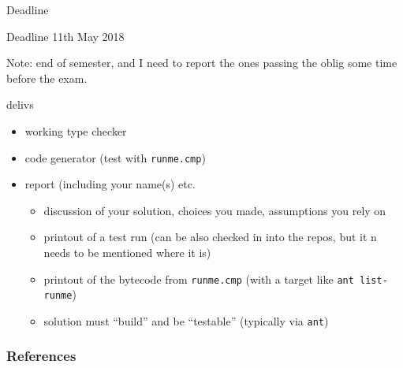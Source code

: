 \documentclass{beamer}
\begin{document}
\begin{frame}[fragile,label={sec:org5445512}]{Deadline}
 \begin{alertblock}{Deadline}
11th May  2018
\end{alertblock}



Note: end of semester, and I need to report the ones passing the oblig some
time before the exam.


\begin{block}{delivs}
\begin{itemize}
\item working type checker
\item code generator (test with \texttt{runme.cmp})
\item report (including your name(s) etc.

\begin{itemize}
\item discussion of your solution, choices you made, assumptions you rely on

\item printout of a test run (can be also checked in into the repos, but it n
needs to be mentioned where it is)
\item printout of the bytecode from \texttt{runme.cmp} (with a target like \texttt{ant
    list-runme})

\item solution must ``build'' and be ``testable'' (typically via \texttt{ant})
\end{itemize}
\end{itemize}
\end{block}
\end{frame}




\begin{frame}[allowframebreaks]
  \frametitle{References}
  {\tiny
    
%     
  }
\end{frame}




\end{document}
